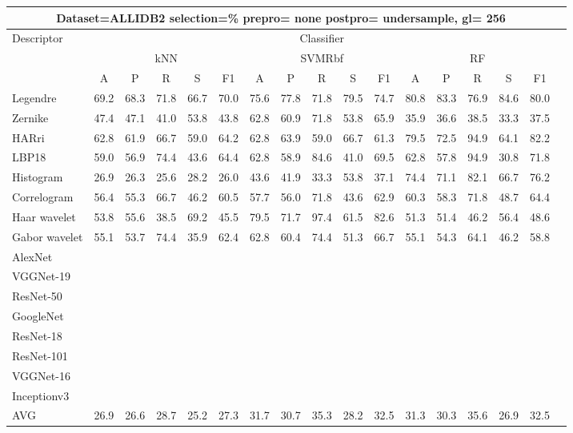 \documentclass[12pt,italian]{article}
\begin{document}
\begin{tiny}
\begin{longtable}{lcccccccccccccccc}
\toprule
\multicolumn{16}{c}{Dataset=ALLIDB2 selection=\% prepro= none postpro= undersample, gl= 256} \\ 
\toprule
Descriptor & \multicolumn{15}{c}{Classifier} \\ 
& \multicolumn{5}{c}{kNN} & \multicolumn{5}{c}{SVMRbf} & \multicolumn{5}{c}{RF} \\ 
& A & P & R & S & F1 & A & P & R & S & F1 & A & P & R & S & F1 \\ 
\midrule
Legendre & 69.2 & 68.3 & 71.8 & 66.7 & 70.0 & 75.6 & 77.8 & 71.8 & 79.5 & 74.7 & 80.8 & 83.3 & 76.9 & 84.6 & 80.0 \\ 
Zernike & 47.4 & 47.1 & 41.0 & 53.8 & 43.8 & 62.8 & 60.9 & 71.8 & 53.8 & 65.9 & 35.9 & 36.6 & 38.5 & 33.3 & 37.5 \\ 
HARri & 62.8 & 61.9 & 66.7 & 59.0 & 64.2 & 62.8 & 63.9 & 59.0 & 66.7 & 61.3 & 79.5 & 72.5 & 94.9 & 64.1 & 82.2 \\ 
LBP18 & 59.0 & 56.9 & 74.4 & 43.6 & 64.4 & 62.8 & 58.9 & 84.6 & 41.0 & 69.5 & 62.8 & 57.8 & 94.9 & 30.8 & 71.8 \\ 
Histogram & 26.9 & 26.3 & 25.6 & 28.2 & 26.0 & 43.6 & 41.9 & 33.3 & 53.8 & 37.1 & 74.4 & 71.1 & 82.1 & 66.7 & 76.2 \\ 
Correlogram & 56.4 & 55.3 & 66.7 & 46.2 & 60.5 & 57.7 & 56.0 & 71.8 & 43.6 & 62.9 & 60.3 & 58.3 & 71.8 & 48.7 & 64.4 \\ 
Haar wavelet & 53.8 & 55.6 & 38.5 & 69.2 & 45.5 & 79.5 & 71.7 & 97.4 & 61.5 & 82.6 & 51.3 & 51.4 & 46.2 & 56.4 & 48.6 \\ 
Gabor wavelet & 55.1 & 53.7 & 74.4 & 35.9 & 62.4 & 62.8 & 60.4 & 74.4 & 51.3 & 66.7 & 55.1 & 54.3 & 64.1 & 46.2 & 58.8 \\ 
AlexNet \\ 
VGGNet-19 \\ 
ResNet-50 \\ 
GoogleNet \\ 
ResNet-18 \\ 
ResNet-101 \\ 
VGGNet-16 \\ 
Inceptionv3 \\ 
\hline
AVG & 26.9 & 26.6 & 28.7 & 25.2 & 27.3 & 31.7 & 30.7 & 35.3 & 28.2 & 32.5 & 31.3 & 30.3 & 35.6 & 26.9 & 32.5 \\ 
\hline
\bottomrule
\end{longtable} 


\end{tiny}
\end{document}
